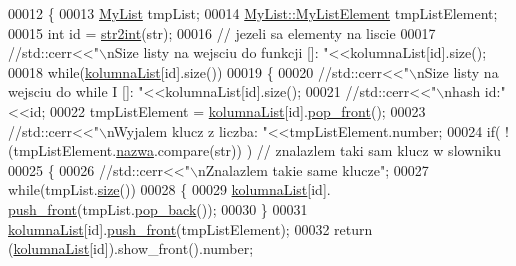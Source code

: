 \begin{DoxyCode}
00012         \{
00013                 \hyperlink{class_my_list}{MyList} tmpList;
00014                 \hyperlink{class_my_list_1_1_my_list_element}{MyList::MyListElement} tmpListElement;
00015                 \textcolor{keywordtype}{int} \textcolor{keywordtype}{id} = \hyperlink{class_dictionary_a53981ac20e3ab2b7544d6f6f3111cdf4}{str2int}(str);
00016                 \textcolor{comment}{// jezeli sa elementy na liscie}
00017                 \textcolor{comment}{//std::cerr<<"\(\backslash\)nSize listy na wejsciu do funkcji []: "<<kolumnaList[id].size();}
00018                 \textcolor{keywordflow}{while}(\hyperlink{class_dictionary_a36adbe694dbbdcbd577d9e8486bdf40a}{kolumnaList}[\textcolor{keywordtype}{id}].size())
00019                 \{
00020                 \textcolor{comment}{//std::cerr<<"\(\backslash\)nSize listy na wejsciu do while I []: "<<kolumnaList[id].size();}
00021                 \textcolor{comment}{//std::cerr<<"\(\backslash\)nhash id:"<<id;}
00022                 tmpListElement = \hyperlink{class_dictionary_a36adbe694dbbdcbd577d9e8486bdf40a}{kolumnaList}[id].\hyperlink{class_my_list_a84369accd705913f85b770770f06767a}{pop\_front}();
00023                 \textcolor{comment}{//std::cerr<<"\(\backslash\)nWyjalem klucz z liczba: "<<tmpListElement.number;}
00024                         \textcolor{keywordflow}{if}( !(tmpListElement.\hyperlink{class_my_list_1_1_my_list_element_af610aeae835150be1a12d538e67a579c}{nazwa}.compare(str)) ) \textcolor{comment}{// znalazlem taki sam klucz w
       slowniku}
00025                                 \{
00026                                 \textcolor{comment}{//std::cerr<<"\(\backslash\)nZnalazlem takie same klucze";}
00027                                         \textcolor{keywordflow}{while}(tmpList.\hyperlink{class_my_list_a6d21c8bfbd9cd31efdba81ba488f43f2}{size}())
00028                                         \{
00029                                                 \hyperlink{class_dictionary_a36adbe694dbbdcbd577d9e8486bdf40a}{kolumnaList}[id].
      \hyperlink{class_my_list_ac703cd9be1c465722e683dbdcececa6b}{push\_front}(tmpList.\hyperlink{class_my_list_afc006104d8156154ad3849d0e4cc6109}{pop\_back}());
00030                                         \}
00031                                         \hyperlink{class_dictionary_a36adbe694dbbdcbd577d9e8486bdf40a}{kolumnaList}[id].\hyperlink{class_my_list_ac703cd9be1c465722e683dbdcececa6b}{push\_front}(tmpListElement);
00032                                         \textcolor{keywordflow}{return} (\hyperlink{class_dictionary_a36adbe694dbbdcbd577d9e8486bdf40a}{kolumnaList}[\textcolor{keywordtype}{id}]).show\_front().number;

\end{DoxyCode}
